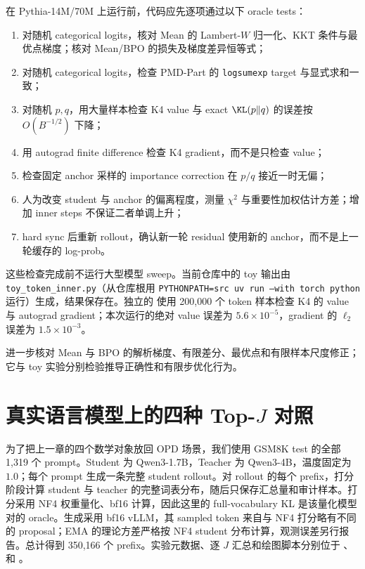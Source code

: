 在 Pythia-14M/70M 上运行前，代码应先逐项通过以下 oracle tests：

\begin{enumerate}
\item 对随机 categorical logits，核对 Mean 的 Lambert-$W$ 归一化、KKT 条件与最优点梯度；核对 Mean/BPO 的损失及梯度差异恒等式；
\item 对随机 categorical logits，检查 PMD-Part 的 \texttt{logsumexp} target 与显式求和一致；
\item 对随机 $p,q$，用大量样本检查 K4 value 与 exact $\KL(p\Vert q)$ 的误差按 $O(B^{-1/2})$ 下降；
\item 用 autograd finite difference 检查 K4 gradient，而不是只检查 value；
\item 检查固定 anchor 采样的 importance correction 在 $p/q$ 接近一时无偏；
\item 人为改变 student 与 anchor 的偏离程度，测量 $\chi^2$ 与重要性加权估计方差；增加 inner steps 不保证二者单调上升；
\item hard sync 后重新 rollout，确认新一轮 residual 使用新的 anchor，而不是上一轮缓存的 log-prob。
\end{enumerate}

这些检查完成前不运行大型模型 sweep。当前仓库中的 toy 输出由
\texttt{toy\_token\_inner.py}（从仓库根用 \texttt{PYTHONPATH=src uv run --with torch python} 运行）生成，结果保存在。独立的
 使用 200,000 个 token 样本检查 K4 的 value 与 autograd gradient；本次运行的绝对 value 误差为 $5.6\times10^{-5}$，gradient 的 $\ell_2$ 误差为 $1.5\times10^{-3}$。

 进一步核对 Mean 与 BPO 的解析梯度、有限差分、最优点和有限样本尺度修正；它与 toy 实验分别检验推导正确性和有限步优化行为。

\section{真实语言模型上的四种 Top-$J$ 对照}

为了把上一章的四个数学对象放回 OPD 场景，我们使用 GSM8K test 的全部 1,319 个 prompt。Student 为 Qwen3-1.7B，Teacher 为 Qwen3-4B，温度固定为 $1.0$；每个 prompt 生成一条完整 student rollout。对 rollout 的每个 prefix，打分阶段计算 student 与 teacher 的完整词表分布，随后只保存汇总量和审计样本。打分采用 NF4 权重量化、bf16 计算，因此这里的 full-vocabulary KL 是该量化模型对的 oracle。生成采用 bf16 vLLM，其 sampled token 来自与 NF4 打分略有不同的 proposal；EMA 的理论方差严格按 NF4 student 分布计算，观测误差另行报告。总计得到 350,166 个 prefix。实验元数据、逐 $J$ 汇总和绘图脚本分别位于
、
 和
。

